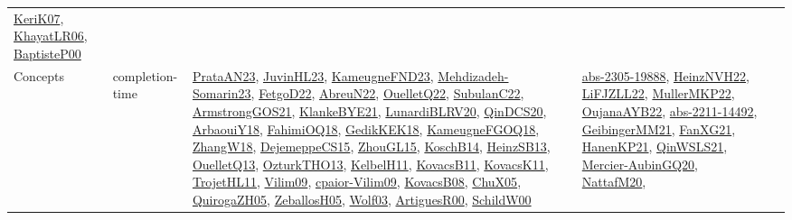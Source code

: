 {\begin{longtable}{lp{3cm}>{\raggedright}p{6cm}>{\raggedright}p{6cm}p{8cm}}
\href{papers/KeriK07.pdf}{KeriK07}\cite{KeriK07}, \href{articles/KhayatLR06.pdf}{KhayatLR06}\cite{KhayatLR06}, \href{articles/BaptisteP00.pdf}{BaptisteP00}\cite{BaptisteP00}\\
Concepts & completion-time & \href{articles/PrataAN23.pdf}{PrataAN23}\cite{PrataAN23}, \href{papers/JuvinHL23.pdf}{JuvinHL23}\cite{JuvinHL23}, \href{papers/KameugneFND23.pdf}{KameugneFND23}\cite{KameugneFND23}, \href{papers/Mehdizadeh-Somarin23.pdf}{Mehdizadeh-Somarin23}\cite{Mehdizadeh-Somarin23}, \href{articles/FetgoD22.pdf}{FetgoD22}\cite{FetgoD22}, \href{articles/AbreuN22.pdf}{AbreuN22}\cite{AbreuN22}, \href{papers/OuelletQ22.pdf}{OuelletQ22}\cite{OuelletQ22}, \href{articles/SubulanC22.pdf}{SubulanC22}\cite{SubulanC22}, \href{papers/ArmstrongGOS21.pdf}{ArmstrongGOS21}\cite{ArmstrongGOS21}, \href{papers/KlankeBYE21.pdf}{KlankeBYE21}\cite{KlankeBYE21}, \href{articles/LunardiBLRV20.pdf}{LunardiBLRV20}\cite{LunardiBLRV20}, \href{articles/QinDCS20.pdf}{QinDCS20}\cite{QinDCS20}, \href{papers/ArbaouiY18.pdf}{ArbaouiY18}\cite{ArbaouiY18}, \href{articles/FahimiOQ18.pdf}{FahimiOQ18}\cite{FahimiOQ18}, \href{articles/GedikKEK18.pdf}{GedikKEK18}\cite{GedikKEK18}, \href{papers/KameugneFGOQ18.pdf}{KameugneFGOQ18}\cite{KameugneFGOQ18}, \href{articles/ZhangW18.pdf}{ZhangW18}\cite{ZhangW18}, \href{papers/DejemeppeCS15.pdf}{DejemeppeCS15}\cite{DejemeppeCS15}, \href{papers/ZhouGL15.pdf}{ZhouGL15}\cite{ZhouGL15}, \href{papers/KoschB14.pdf}{KoschB14}\cite{KoschB14}, \href{articles/HeinzSB13.pdf}{HeinzSB13}\cite{HeinzSB13}, \href{papers/OuelletQ13.pdf}{OuelletQ13}\cite{OuelletQ13}, \href{articles/OzturkTHO13.pdf}{OzturkTHO13}\cite{OzturkTHO13}, \href{articles/KelbelH11.pdf}{KelbelH11}\cite{KelbelH11}, \href{articles/KovacsB11.pdf}{KovacsB11}\cite{KovacsB11}, \href{articles/KovacsK11.pdf}{KovacsK11}\cite{KovacsK11}, \href{articles/TrojetHL11.pdf}{TrojetHL11}\cite{TrojetHL11}, \href{papers/Vilim09.pdf}{Vilim09}\cite{Vilim09}, \href{papers/cpaior-Vilim09.pdf}{cpaior-Vilim09}\cite{cpaior-Vilim09}, \href{articles/KovacsB08.pdf}{KovacsB08}\cite{KovacsB08}, \href{papers/ChuX05.pdf}{ChuX05}\cite{ChuX05}, \href{papers/QuirogaZH05.pdf}{QuirogaZH05}\cite{QuirogaZH05}, \href{articles/ZeballosH05.pdf}{ZeballosH05}\cite{ZeballosH05}, \href{papers/Wolf03.pdf}{Wolf03}\cite{Wolf03}, \href{articles/ArtiguesR00.pdf}{ArtiguesR00}\cite{ArtiguesR00}, \href{articles/SchildW00.pdf}{SchildW00}\cite{SchildW00} & \href{articles/abs-2305-19888.pdf}{abs-2305-19888}\cite{abs-2305-19888}, \href{articles/HeinzNVH22.pdf}{HeinzNVH22}\cite{HeinzNVH22}, \href{papers/LiFJZLL22.pdf}{LiFJZLL22}\cite{LiFJZLL22}, \href{articles/MullerMKP22.pdf}{MullerMKP22}\cite{MullerMKP22}, \href{papers/OujanaAYB22.pdf}{OujanaAYB22}\cite{OujanaAYB22}, \href{articles/abs-2211-14492.pdf}{abs-2211-14492}\cite{abs-2211-14492}, \href{papers/GeibingerMM21.pdf}{GeibingerMM21}\cite{GeibingerMM21}, \href{articles/FanXG21.pdf}{FanXG21}\cite{FanXG21}, \href{papers/HanenKP21.pdf}{HanenKP21}\cite{HanenKP21}, \href{articles/QinWSLS21.pdf}{QinWSLS21}\cite{QinWSLS21}, \href{papers/Mercier-AubinGQ20.pdf}{Mercier-AubinGQ20}\cite{Mercier-AubinGQ20}, \href{papers/NattafM20.pdf}{NattafM20}\cite{NattafM20}, 
\end{longtable}}
